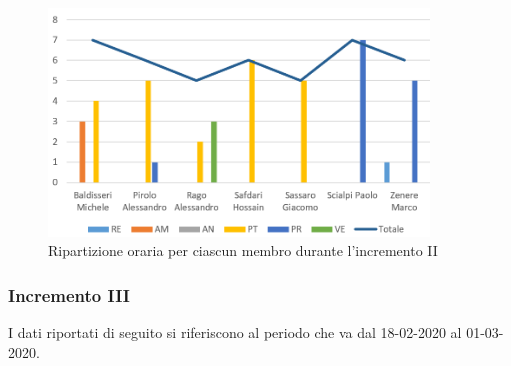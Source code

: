 \begin{figure}[!htb]   
    \centering
    \includegraphics[width=0.9\textwidth]{Images/inc2}
	\caption{Ripartizione oraria per ciascun membro durante l'incremento II}
\end{figure}

\subsubsection{Incremento III}

I dati riportati di seguito si riferiscono al periodo che va dal 18-02-2020 al 01-03-2020.

